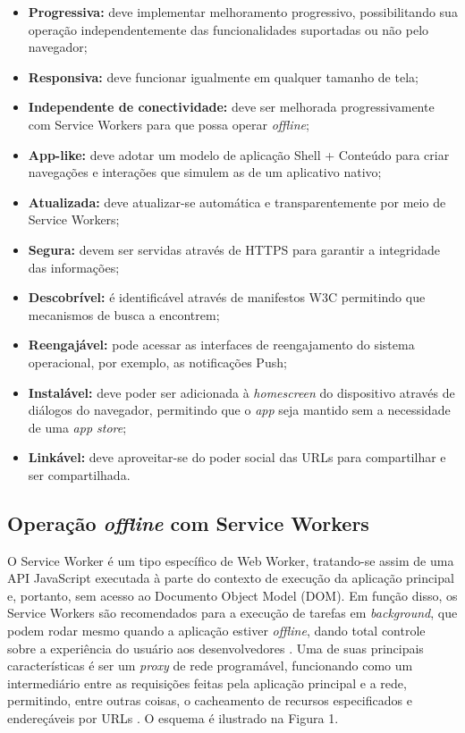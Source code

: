 \documentclass[
	article,			%
	11pt,				%
	oneside,			%
	a4paper,			%
	english,			%
	brazil,				%
	sumario=tradicional
	]{abntex2}
\begin{document}
\begin{itemize}
	\item
	\textbf{Progressiva:} deve implementar melhoramento progressivo, possibilitando sua operação independentemente das funcionalidades suportadas ou não pelo navegador;
	\item
	\textbf{Responsiva:} deve funcionar igualmente em qualquer tamanho de tela;
	\item
	\textbf{Independente de conectividade:} deve ser melhorada progressivamente com Service Workers para que possa operar \textit{offline};
	\item
	\textbf{App-like:} deve adotar um modelo de aplicação Shell + Conteúdo para criar navegações e interações que simulem as de um aplicativo nativo;
	\item
	\textbf{Atualizada:} deve atualizar-se automática e transparentemente por meio de Service Workers;
	\item
	\textbf{Segura:} devem ser servidas através de HTTPS para garantir a integridade das informações;
	\item
	\textbf{Descobrível:} é identificável através de manifestos W3C permitindo que mecanismos de busca a encontrem;
	\item
	\textbf{Reengajável:} pode acessar as interfaces de reengajamento do sistema operacional, por exemplo, as notificações Push;
	\item
	\textbf{Instalável:} deve poder ser adicionada à \textit{homescreen} do dispositivo através de diálogos do navegador, permitindo que o \textit{app} seja mantido sem a necessidade de uma \textit{app store};
	\item 
	\textbf{Linkável:} deve aproveitar-se do poder social das URLs para compartilhar e ser compartilhada.
\end{itemize}

\subsection{Operação \textit{offline} com Service Workers}

O Service Worker é um tipo específico de Web Worker, tratando-se assim de uma API JavaScript executada à parte do contexto de execução da aplicação principal e, portanto, sem acesso ao Documento Object Model (DOM). Em função disso, os Service Workers são recomendados para a execução de tarefas em \textit{background}, que podem rodar mesmo quando a aplicação estiver \textit{offline}, dando total controle sobre a experiência do usuário aos desenvolvedores \cite{gaunt-2017}. Uma de suas principais características é ser um \textit{proxy} de rede programável, funcionando como um intermediário entre as requisições feitas pela aplicação principal e a rede, permitindo, entre outras coisas, o cacheamento de recursos especificados e endereçáveis por URLs \cite{gaunt-2017}. O esquema é ilustrado na Figura 1.
\end{document}

